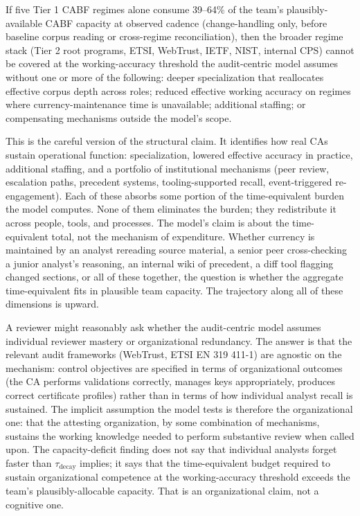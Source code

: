 \documentclass[11pt,letterpaper]{article}
\renewenvironment{quote}{%
  \list{}{\leftmargin=1.5em\rightmargin=1.5em\itemsep=0pt}\item[]\small%
}{%
  \endlist%
}
\begin{document}
\begin{quote}
If five Tier 1 CABF regimes alone consume 39--64\% of the team's plausibly-available CABF capacity at observed cadence (change-handling only, before baseline corpus reading or cross-regime reconciliation), then the broader regime stack (Tier 2 root programs, ETSI, WebTrust, IETF, NIST, internal CPS) cannot be covered at the working-accuracy threshold the audit-centric model assumes without one or more of the following: deeper specialization that reallocates effective corpus depth across roles; reduced effective working accuracy on regimes where currency-maintenance time is unavailable; additional staffing; or compensating mechanisms outside the model's scope.
\end{quote}

This is the careful version of the structural claim. It identifies how real CAs sustain operational function: specialization, lowered effective accuracy in practice, additional staffing, and a portfolio of institutional mechanisms (peer review, escalation paths, precedent systems, tooling-supported recall, event-triggered re-engagement). Each of these absorbs some portion of the time-equivalent burden the model computes. None of them eliminates the burden; they redistribute it across people, tools, and processes. The model's claim is about the time-equivalent total, not the mechanism of expenditure. Whether currency is maintained by an analyst rereading source material, a senior peer cross-checking a junior analyst's reasoning, an internal wiki of precedent, a diff tool flagging changed sections, or all of these together, the question is whether the aggregate time-equivalent fits in plausible team capacity. The trajectory along all of these dimensions is upward.

A reviewer might reasonably ask whether the audit-centric model assumes individual reviewer mastery or organizational redundancy. The answer is that the relevant audit frameworks (WebTrust, ETSI EN 319 411-1) are agnostic on the mechanism: control objectives are specified in terms of organizational outcomes (the CA performs validations correctly, manages keys appropriately, produces correct certificate profiles) rather than in terms of how individual analyst recall is sustained. The implicit assumption the model tests is therefore the organizational one: that the attesting organization, by some combination of mechanisms, sustains the working knowledge needed to perform substantive review when called upon. The capacity-deficit finding does not say that individual analysts forget faster than $\tau_{\text{decay}}$ implies; it says that the time-equivalent budget required to sustain organizational competence at the working-accuracy threshold exceeds the team's plausibly-allocable capacity. That is an organizational claim, not a cognitive one.
\end{document}
